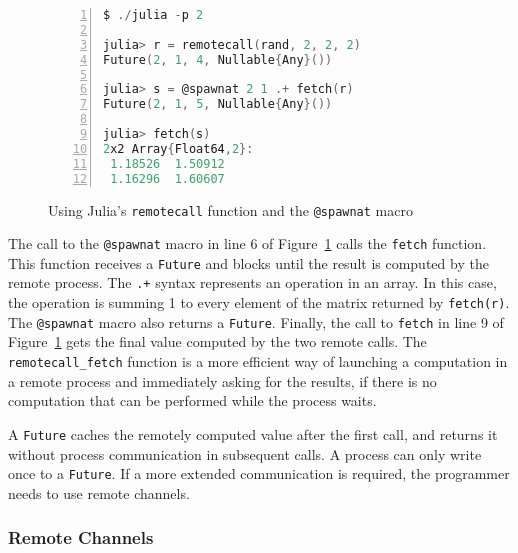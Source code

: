 \begin{figure}[htpb]
    \begin{minipage}{\linewidth}
    \begin{lstlisting}[language=C, basicstyle=\ttfamily\scriptsize,
        numbers=left,
        frame=no, showspaces=false, showstringspaces=false,
        numberstyle=\scriptsize,
        xleftmargin=1.5cm,
        keywords={%
            @spawnat, remotecall, Nullable, Any,
            fetch, Future, Array, Float64, julia%
        },
        otherkeywords={::, \&, \*, +, -, /, [, ], >, <}
    ]
$ ./julia -p 2

julia> r = remotecall(rand, 2, 2, 2)
Future(2, 1, 4, Nullable{Any}())

julia> s = @spawnat 2 1 .+ fetch(r)
Future(2, 1, 5, Nullable{Any}())

julia> fetch(s)
2x2 Array{Float64,2}:
 1.18526  1.50912
 1.16296  1.60607

    \end{lstlisting}
    \end{minipage}
    \caption{Using Julia's \texttt{remotecall} function and the \texttt{@spawnat} macro}
    \label{fig:remotecall_example}
\end{figure}

The call to the \texttt{@spawnat} macro in line 6 of
Figure~\ref{fig:remotecall_example} calls the \texttt{fetch} function. This
function receives a \texttt{Future} and blocks until the result is computed by
the remote process. The \texttt{.+} syntax represents an operation in an array.
In this case, the operation is summing 1 to every element of the matrix
returned by \texttt{fetch(r)}. The \texttt{@spawnat} macro also returns a
\texttt{Future}.  Finally, the call to \texttt{fetch} in line 9 of
Figure~\ref{fig:remotecall_example} gets the final value computed by the two
remote calls. The \texttt{remotecall\_fetch} function is a more efficient way
of launching a computation in a remote process and immediately asking for the
results, if there is no computation that can be performed while the process
waits.

A \texttt{Future} caches the remotely computed value after the first call,
and returns it without process communication in subsequent calls. A process
can only write once to a \texttt{Future}. If a more extended communication
is required, the programmer needs to use remote channels.

\subsubsection{Remote Channels}


